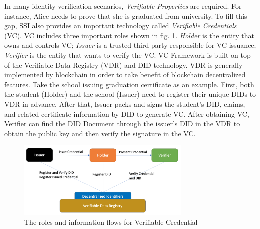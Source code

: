 \documentclass[conference, dvipdfmx]{IEEEtran} %
\begin{document}
\begin{sloppypar}
In many identity verification scenarios, \textit{Verifiable Properties} are required. For instance, Alice needs to prove that she is graduated from university.  To fill this gap, SSI also provides an important technology called \textit{Verifiable Credentials} (VC). VC includes three important roles shown in fig. \ref{fig:vc_framework}. \textit{Holder} is the entity that owns and controls VC; \textit{Issuer} is a trusted third party responsible for VC issuance; \textit{Verifier} is the entity that wants to verify the VC. VC Framework is built on top of the Verifiable Data Registry (VDR) and DID technology. VDR is generally implemented by blockchain in order to take benefit of blockchain decentralized features. Take the school issuing graduation certificate as an example. First, both the student (Holder) and the school (Issuer) need to register their unique DIDs to VDR in advance. After that, Issuer packs and signs the student's DID, claims, and related certificate information by DID to generate VC. After obtaining VC, Verifier can find the DID Document through the issuer's DID in the VDR to obtain the public key and then verify the signature in the VC.


\begin{figure}[htbp] %
  \centering  
  \includegraphics[width=83mm]{images/vc_framework.png} %
  \caption{The roles and information flows for Verifiable Credential} %
  \label{fig:vc_framework} %
\end{figure}



\end{sloppypar}
\end{document}

